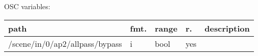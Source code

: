 \begin{snugshade}
{\footnotesize
\label{osctab:tascarapallpass}
OSC variables:
\nopagebreak

\begin{tabularx}{\textwidth}{llllX}
\hline
path & fmt. & range & r. & description\\
\hline
/scene/in/0/ap2/allpass/bypass & i & bool & yes & \\
\hline
\end{tabularx}
}
\end{snugshade}
